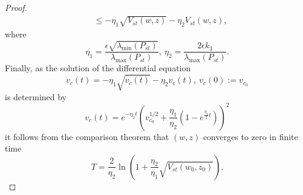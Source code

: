 \documentclass[onecolumn]{IEEEtran}
\newtheorem{proof}{Proof}
\begin{document}
\begin{proof}
\begin{equation*}
\begin{split}
	&\leq -\eta_1 \sqrt{V_{st}(w,z)}-\eta_2 V_{st}(w,z),
	\end{split}
	\end{equation*}
	where
	\begin{equation*}
	\eta_1=\frac{\epsilon \sqrt{\lambda_{\min} (P_{st})}}{\lambda_{\max}(P_{st})},\:\eta_2=\frac{2\epsilon k_3}{\lambda_{\max}(P_{st})}.
	\end{equation*}
	Finally, as the solution of the differential equation
	\begin{equation*}
	\dot v_c(t)=-\eta_1 \sqrt{v_c(t)}-\eta_2 v_c(t), \:v_c(0):=v_{c_0}
	\end{equation*}
	is determined by
	\begin{equation*}
	v_c(t)=e^{-\eta_2 t }\left(v_{c_0}^{1/2}+\dfrac{\eta_1}{\eta_2}\left(1-e^{\frac{{\eta_2}}{2}t}\right)\right)^2
	\end{equation*}
	it follows from the comparison theorem that $(w,z)$ converges to zero in finite time
	\begin{equation*}
	T=\dfrac{2}{\eta_2}\ln \left(1+\dfrac{\eta_2}{\eta_1}\sqrt{V_{st}(w_0,z_0)}\right).
	\end{equation*}	
\end{proof}
%
%
%
%

   
\end{document}
